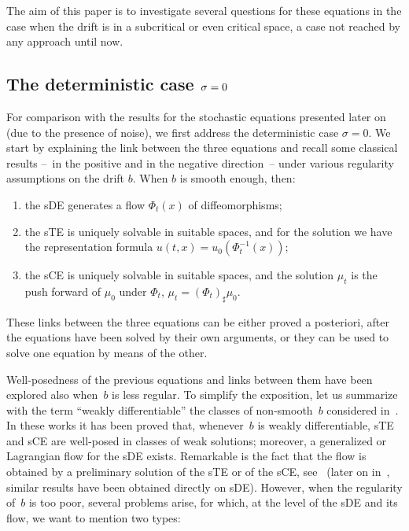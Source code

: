 \documentclass[a4paper,10pt]{article}
\newcommand\1{\mathbbm{1}}
\numberwithin{equation}{section}
\begin{document}
The aim of this paper is to investigate several questions for these equations in the case when the drift is in a subcritical or even critical space, a case not reached by any approach until now.

\subsection{The deterministic case $\protect\sigma=0$}\label{subsection deterministic}

For comparison with the results for the stochastic equations presented later on (due to the presence of noise), we first address the deterministic case $\sigma=0$. We start by explaining the link between the three equations and recall some classical results --~in the positive and in the negative direction~-- under various regularity
assumptions on the drift $b$. When $b$ is smooth enough, then:
\begin{enumerate}[font=\normalfont, label=(\roman{*}), ref=(\roman{*})]
  \item the sDE generates a flow $\Phi_{t}(x)$ of diffeomorphisms;
  \item the sTE is uniquely solvable in suitable spaces, and for the solution we have the representation formula $u(t,x) =u_{0}(\Phi_{t}^{-1}(x) )$;
  \item the sCE is uniquely solvable in suitable spaces, and the solution $\mu_{t}$
  is the push forward of $\mu_{0}$ under $\Phi_{t}$, $\mu_{t}=(\Phi
  _{t}) _{\sharp}\mu_{0}$.
\end{enumerate}
These links between the three equations can be either proved a posteriori, after the equations have been solved by their own arguments, or they can be used to solve one equation by means of the other.

Well-posedness of the previous equations and links between them have been explored also when~$b$ is less regular. To simplify the exposition, let us summarize with the term ``weakly differentiable'' the classes of non-smooth~$b$ considered in~\cite{DIPELI89,AMBROSIO04}. In these works it has been proved that, whenever~$b$ is
weakly differentiable, sTE and sCE are well-posed in classes of weak solutions; moreover, a generalized or Lagrangian flow for the sDE exists. Remarkable is the fact that the flow is obtained by a preliminary solution of the sTE or of the sCE, see~\cite{DIPELI89,AMBROSIO04} (later on in~\cite{CrDeL}, similar results have been obtained directly on sDE). However, when the regularity of~$b$ is too poor, several problems arise, for which, at the level of the sDE and its flow, we want to mention two types:
\end{document}
